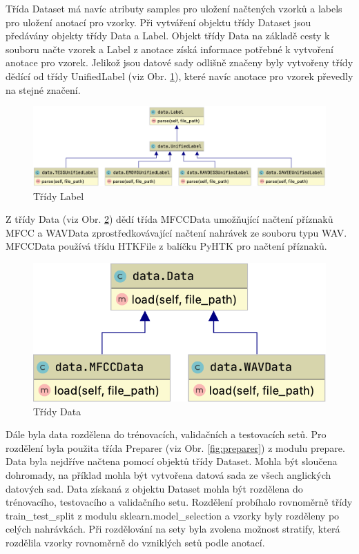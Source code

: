 \documentclass[FM,BP]{tulthesis}
\begin{document}
Třída Dataset má navíc atributy samples pro uložení načtených vzorků a labels pro uložení anotací pro vzorky. Při vytváření objektu třídy Dataset jsou předávány objekty třídy Data a Label. Objekt třídy Data na základě cesty k souboru načte vzorek a Label z anotace získá informace potřebné k vytvoření anotace pro vzorek. Jelikož jsou datové sady odlišně značeny byly vytvořeny třídy dědící od třídy UnifiedLabel (viz Obr. \ref{fig:label}), které navíc anotace pro vzorek převedly na stejné značení.

\begin{figure}[h]
\centerline{\includegraphics[scale=.25,keepaspectratio]{data-label.png}}
\caption{Třídy Label}
\label{fig:label}
\end{figure}
\FloatBarrier

Z třídy Data (viz Obr. \ref{fig:data}) dědí třída MFCCData umožňující načtení příznaků MFCC a WAVData zprostředkovávající načtení nahrávek ze souboru typu WAV. MFCCData používá třídu HTKFile z balíčku PyHTK pro načtení příznaků.

\begin{figure}[h]
\centerline{\includegraphics[scale=.25,keepaspectratio]{data-data.png}}
\caption{Třídy Data}
\label{fig:data}
\end{figure}
\FloatBarrier

Dále byla data rozdělena do trénovacích, validačních a testovacích setů. Pro rozdělení byla použita třída Preparer (viz Obr. \ref{fig:preparer}) z modulu prepare. Data byla nejdříve načtena pomocí objektů třídy Dataset. Mohla být sloučena dohromady, na příklad mohla být vytvořena datová sada ze všech anglických datových sad. Data získaná z objektu Dataset mohla být rozdělena do trénovacího, testovacího a validačního setu. Rozdělení probíhalo rovnoměrně třídy train\_test\_split z modulu sklearn.model\_selection a vzorky byly rozděleny po celých nahrávkách. Při rozdělování na sety byla zvolena možnost stratify, která rozdělila vzorky rovnoměrně do vzniklých setů podle anotací.
\end{document}
